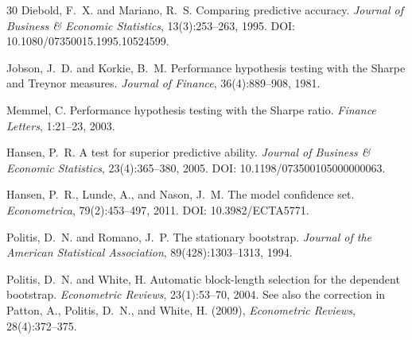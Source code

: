 \begin{thebibliography}{30}
Diebold, F.~X. and Mariano, R.~S.
\newblock Comparing predictive accuracy.
\newblock \emph{Journal of Business \& Economic Statistics}, 13(3):253--263, 1995.
\newblock DOI: 10.1080/07350015.1995.10524599.

Jobson, J.~D. and Korkie, B.~M.
\newblock Performance hypothesis testing with the Sharpe and Treynor measures.
\newblock \emph{Journal of Finance}, 36(4):889--908, 1981.

Memmel, C.
\newblock Performance hypothesis testing with the Sharpe ratio.
\newblock \emph{Finance Letters}, 1:21--23, 2003.

Hansen, P.~R.
\newblock A test for superior predictive ability.
\newblock \emph{Journal of Business \& Economic Statistics}, 23(4):365--380, 2005.
\newblock DOI: 10.1198/073500105000000063.

Hansen, P.~R., Lunde, A., and Nason, J.~M.
\newblock The model confidence set.
\newblock \emph{Econometrica}, 79(2):453--497, 2011.
\newblock DOI: 10.3982/ECTA5771.

Politis, D.~N. and Romano, J.~P.
\newblock The stationary bootstrap.
\newblock \emph{Journal of the American Statistical Association}, 89(428):1303--1313, 1994.

Politis, D.~N. and White, H.
\newblock Automatic block-length selection for the dependent bootstrap.
\newblock \emph{Econometric Reviews}, 23(1):53--70, 2004.
\newblock See also the correction in Patton, A., Politis, D.~N., and White, H. (2009), \emph{Econometric Reviews}, 28(4):372--375.

\end{thebibliography}
